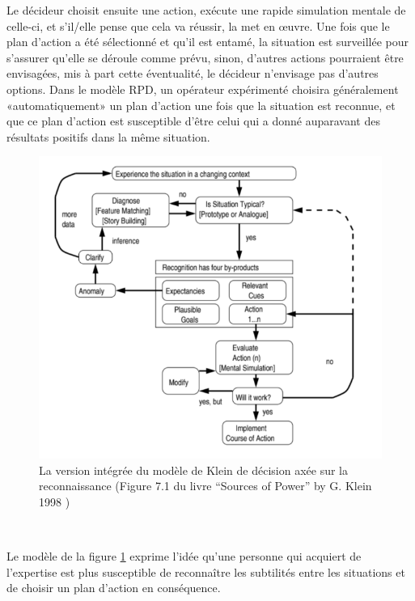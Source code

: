 Le décideur choisit ensuite une action, exécute une rapide simulation mentale de
celle-ci, et s'il/elle pense que cela va réussir, la met en œuvre. Une fois que le plan d’action  a été sélectionné et qu’il est entamé, la situation est surveillée pour s’assurer qu’elle se déroule comme prévu, sinon, d’autres actions pourraient être envisagées, mis à part cette éventualité, le décideur n'envisage pas d'autres options. Dans le modèle RPD, un opérateur expérimenté
choisira généralement «automatiquement» un plan d’action une fois que la situation est
reconnue, et que ce plan d’action est susceptible d’être celui qui a donné  auparavant
des résultats positifs dans la même situation.


\begin{figure}[th]
\centering
\includegraphics{Figures/klein.PNG}
\decoRule
\caption[ La version intégrée  du modèle de Klein de décision axée sur la reconnaissance] { La version intégrée  du modèle de Klein de décision axée sur la reconnaissance
(Figure 7.1 du livre “Sources of Power” by G. Klein 1998 \parencite{klein2017sources}) }
\label{fig:klein}
\end{figure}


~\par
Le modèle de la figure \ref{fig:klein} exprime l’idée qu’une personne qui acquiert de l’expertise est plus susceptible 
de reconnaître les subtilités entre les situations et de choisir un plan d’action en conséquence.



